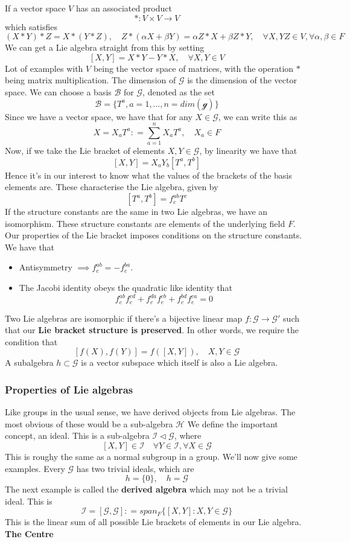 \documentclass[11pt, oneside]{article}   	%
\theoremstyle{slanted}
\newcommand{\lalg}{ \mathcal{ G } }
\begin{document}
If a vector space $V$ has an associated product 
\[ * : V \times V \rightarrow V \]
which satisfies 
\[ 
 ( X * Y) * Z  = X * ( Y * Z ), \quad Z * ( \alpha X + \beta Y ) = \alpha Z * X + \beta Z * Y, \quad  \forall X, Y Z \in V, \forall \alpha, \beta \in F \] 
We can get a Lie algebra straight from this by setting 
\[ 
	 [ X , Y ] = X * Y - Y * X, \quad \forall X, Y \in V 
\] Lot of examples with $ V $ being the vector space of matrices, with the operation $ * $ being matrix multiplication. The dimension of $\lalg$ is the dimension of the vector space. We can choose a basis $\mathcal{ B }$ for $\lalg$, denoted as the set 
\[ 
	 \mathcal{ B} = \{ T^ a, a = 1, \dots, n = dim ( \mathcal{ g } ) \} 
\] Since we have a vector space, we have that for any $X \in \lalg$, we can write this as 
\[ 
 	X  = X_a T^a  : = \sum_{ a = 1}^n X_a T^a, \quad X_a \in F 
\] Now, if we take the Lie bracket of elements $ X, Y \in \lalg$, by linearity we have that 
\[
	[X, Y ] = X_a Y_b [ T^a , T^b ]
\] Hence it's in our interest to know what the values of the brackets of the basis elements are. These characterise the Lie algebra, given by 
\[ 
	 [ T^a, T^b ] = f^{ ab }_c T^c 
\] If the structure constants are the same in two Lie algebras, we have an isomorphism. These structure constants are elements of the underlying field $ F$. Our properties of the Lie bracket imposes conditions on the structure constants. We have that 
\begin{itemize} 
	\item Antisymmetry $ \implies f^{ ab}_c =  - f^{ ba }_c $. 
	\item The Jacobi identity obeys the quadratic like identity that 
	\[ 
		 f^{ ab}_c f^{ cd}_e + f^{da}_c f^{ cb}_e + f^{ bd}_c f^{ ca}_e  =0 
	\] 
\end{itemize} 
Two Lie algebras are isomorphic if there's a bijective linear map $ f: \lalg \rightarrow \lalg' $ such that our \textbf{Lie bracket structure is preserved}. In other words, we require the condition that 
\[
	 [ f( X), f( Y) ] = f ( [ X, Y ] ), \quad X, Y \in \lalg
\] 
A subalgebra $h \subset \lalg $ is a vector subspace which itself is also a Lie algebra. 

\subsubsection{Properties of Lie algebras}
Like groups in the usual sense, we have derived objects from Lie algebras. The most obvious of these would be a sub-algebra $\mathcal{H}$ We define the important concept, an ideal. This is a sub-algebra $\mathcal{I} \triangleleft \mathcal{G} $, where 
\[ 
	[X, Y] \in \mathcal{I} \quad \forall Y \in \mathcal{I}, \forall X \in \mathcal{G}
\] This is roughy the same as a normal subgroup in a group. We'll now give some examples. Every $\lalg$ has two trivial ideals, which are 
\[ 
 	h = \{ 0 \}, \quad h = \lalg
\] 
The next example is called the \textbf{derived algebra} which may not be a trivial ideal. This is 
\[ 
 	\mathcal{I } = [ \lalg, \lalg ] : = span_F \{ [ X, Y ] : X, Y \in \lalg \} 
\] This is the linear sum of all possible Lie brackets of elements in our Lie algebra. 
\textbf{The Centre}
\end{document}
